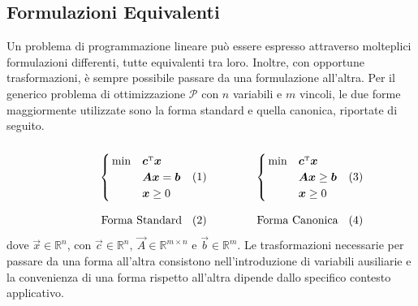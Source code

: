 \subsection{Formulazioni Equivalenti}
Un problema di programmazione lineare può essere espresso attraverso
molteplici formulazioni differenti, tutte equivalenti tra loro. Inoltre,
con opportune trasformazioni, è sempre possibile passare da una
formulazione all'altra. Per il generico problema di ottimizzazione
$\mathcal{P}$ con $n$ variabili e $m$ vincoli, le due forme maggiormente
utilizzate sono la forma standard e quella canonica, riportate di seguito.
\\
\begin{subequations}
\hspace*{.08\textwidth}
\begin{minipage}{.3\textwidth}
\begin{align}\notag
    \begin{cases}
        \,\min & \vec{c}^{\tr} \vec{x} \\
               & \vec{A} \vec{x} = \vec{b} \\\label{eq:LPstd}
             & \vec{x} \ge 0
    \end{cases}\\[7pt] \text{Forma Standard}
\end{align}
\end{minipage}\hspace{.1\textwidth}
\begin{minipage}{.3\textwidth}
    \begin{align}\notag
    \begin{cases}
        \,\min & \vec{c}^{\tr} \vec{x} \\
               & \vec{A} \vec{x} \ge \vec{b} \\\label{eq:LPcanonical}
             & \vec{x} \ge 0
    \end{cases}\\[7pt] \text{Forma Canonica}
\end{align}
\end{minipage}\\[10pt]
\end{subequations}
dove $\vec{x} \in \mathbb{R}^n$, con $\vec{c} \in \mathbb{R}^n,\ \vec{A}
\in \mathbb{R}^{m \times n}$ e $\vec{b} \in \mathbb{R}^m$.
Le trasformazioni necessarie per passare da una forma all'altra consistono
nell'introduzione di variabili ausiliarie e la convenienza di una forma
rispetto all'altra dipende dallo specifico contesto applicativo.

